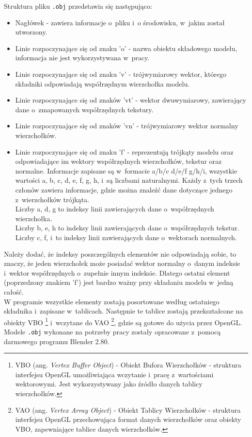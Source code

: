 \documentclass[a4paper,twoside,12pt]{book}
\newcommand{\obcy}[1]{\emph{#1}}
\newcommand{\ang}[1]{{\selectlanguage{british}\obcy{#1}}}
\begin{document}
Struktura pliku \texttt{.obj} przedstawia się następująco:
\begin{itemize}
    \item Nagłówek - zawiera informacje o~pliku i~o środowisku, w~jakim został utworzony.
    \item Linie rozpoczynające się od znaku 'o' - nazwa obiektu składowego modelu, informacja nie jest wykorzystywana w~pracy.
    \item Linie rozpoczynające się od znaku 'v' - trójwymiarowy wektor, którego składniki odpowiadają współrzędnym wierzchołka modelu.
    \item Linie rozpoczynające się od znaków 'vt' - wektor dwuwymiarowy, zawierający dane o~zmapowanych współrzędnych tekstury.
    \item Linie rozpoczynające się od znaków 'vn' - trójwymiarowy wektor normalny wierzchołków.
    \item Linie rozpoczynające się od znaku 'f' - reprezentują trójkąty modelu oraz odpowiadające im wektory współrzędnych wierzchołków, tekstur oraz normalne. Informacje zapisane są w~formacie a/b/c d/e/f g/h/i, wszystkie wartości a, b, c, d, e, f, g, h, i~są liczbami naturalnymi. Każdy z~tych trzech członów zawiera informacje, gdzie można znaleźć dane dotyczące jednego z~wierzchołków trójkąta. \\
    Liczby a, d, g to indeksy linii zawierających dane o~współrzędnych wierzchołka. \\
    Liczby b, e, h to indeksy linii zawierających dane o~współrzędnych tekstur. \\
    Liczby c, f, i~to indeksy linii zawierających dane o~wektorach normalnych.
\end{itemize}
Należy dodać, że indeksy poszczególnych elementów nie odpowiadają sobie, to znaczy, że jeden wierzchołek może posiadać wektor normalny o~danym indeksie i~wektor współrzędnych o~zupełnie innym indeksie. Dlatego ostatni element (poprzedzony znakiem 'f') jest bardzo ważny przy składaniu modelu w~jedną całość. \\
W programie wszystkie elementy zostają posortowane według ostatniego składnika i~zapisane w~tablicach. Następnie te tablice zostają przekształcone na obiekty VBO \footnote{VBO (ang. \ang{Vertex Buffer Object}) - 
Obiekt Bufora Wierzchołków - struktura interfejsu OpenGL umożliwiająca wczytanie i~pracę z~wartościami wektorowymi. 
Jest wykorzystywany jako źródło danych tablicy wierzchołków.} i~wczytane do VAO \footnote{VAO (ang. \ang{Vertex Array Object}) - 
Obiekt Tablicy Wierzchołków - struktura interfejsu OpenGL przechowująca format danych wierzchołków oraz obiekty VBO, zapewniające tablice danych wierzchołków.}, gdzie są gotowe do użycia przez OpenGL. \\
Modele \texttt{.obj} wykonane na potrzeby pracy zostały opracowane z~pomocą darmowego programu Blender 2.80.
\end{document}
